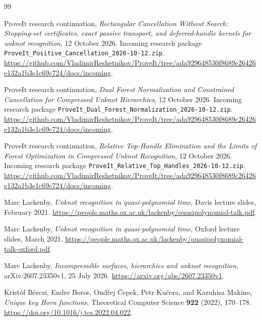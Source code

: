 \begingroup
\raggedright
\begin{thebibliography}{99}

ProveIt research continuation,
\emph{Rectangular Cancellation Without Search:
Stopping-set certificates, exact passive transport, and deferred-handle
kernels for unknot recognition}, 12 October 2026.
Incoming research package
\texttt{ProveIt\_Positive\_Cancellation\_2026-10-12.zip}.
\url{https://github.com/VladimirReshetnikov/ProveIt/tree/ada929648530f8689c26426e132a1b3e1c69c724/docs/incoming}.

ProveIt research continuation,
\emph{Dual Forest Normalization and Constrained Cancellation for
Compressed Unknot Hierarchies}, 12 October 2026.
Incoming research package
\texttt{ProveIt\_Dual\_Forest\_Normalization\_2026-10-12.zip}.
\url{https://github.com/VladimirReshetnikov/ProveIt/tree/ada929648530f8689c26426e132a1b3e1c69c724/docs/incoming}.

ProveIt research continuation,
\emph{Relative Top-Handle Elimination and the Limits of Forest
Optimization in Compressed Unknot Recognition}, 12 October 2026.
Incoming research package
\texttt{ProveIt\_Relative\_Top\_Handles\_2026-10-12.zip}.
\url{https://github.com/VladimirReshetnikov/ProveIt/tree/ada929648530f8689c26426e132a1b3e1c69c724/docs/incoming}.

Marc Lackenby,
\emph{Unknot recognition in quasi-polynomial time},
Davis lecture slides, February 2021.
\url{https://people.maths.ox.ac.uk/lackenby/quasipolynomial-talk.pdf}.

Marc Lackenby,
\emph{Unknot recognition in quasi-polynomial time},
Oxford lecture slides, March 2021.
\url{https://people.maths.ox.ac.uk/lackenby/quasipolynomial-talk-oxford.pdf}.

Marc Lackenby,
\emph{Incompressible surfaces, hierarchies and unknot recognition},
arXiv:2607.23350v1, 25 July 2026.
\url{https://arxiv.org/abs/2607.23350v1}.

Krist\'of B\'erczi, Endre Boros, Ond\v{r}ej \v{C}epek,
Petr Ku\v{c}era, and Kazuhisa Makino,
\emph{Unique key Horn functions},
Theoretical Computer Science \textbf{922} (2022), 170--178.
\url{https://doi.org/10.1016/j.tcs.2022.04.022}.


\end{thebibliography}
